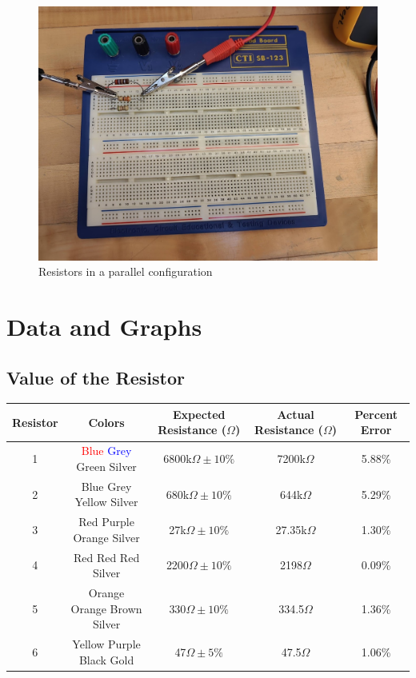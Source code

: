 \documentclass[titlepage]{article}
\begin{document}
        \FloatBarrier
        \begin{figure}[hbt!]
            \centering
            \caption{Resistors in a parallel configuration}
            \includegraphics[scale=0.2]{procedure/parallel} 
        \end{figure}



	\section{Data and Graphs}
	\subsection{Value of the Resistor}
		\begin{center}
		\begin{tabular}{c|c|c|c|c}
			Resistor & Colors & Expected Resistance (\(\Omega\)) & Actual Resistance (\(\Omega\)) & Percent Error \\
			\hline
			1 &\textcolor{red}{ Blue} \textcolor{blue}{ Grey} Green Silver & 6800k\(\Omega \pm 10\%\) & 7200k\(\Omega\) & 5.88\% \\
			2 & Blue Grey Yellow Silver & 680k\(\Omega \pm 10\%\) & 644k\(\Omega\) & 5.29\% \\
			3 & Red Purple Orange Silver & 27k\(\Omega \pm 10\%\) & 27.35k\(\Omega\) & 1.30\% \\
			4 & Red Red Red Silver & 2200\(\Omega \pm 10\%\) & 2198\(\Omega\) & 0.09\% \\
			5 & Orange Orange Brown Silver & 330\(\Omega \pm 10\%\) & 334.5\(\Omega\) & 1.36\% \\
			6 & Yellow Purple Black Gold & 47\(\Omega \pm 5\%\) & 47.5\(\Omega\) & 1.06\% \\
			
		\end{tabular}
	\end{center}
\end{document}
